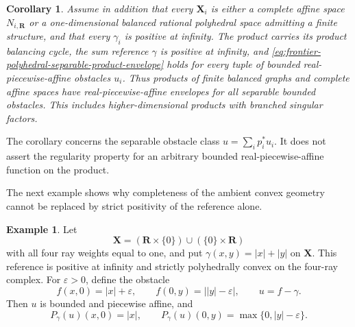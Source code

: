 \documentclass[11pt,a4paper]{article}
\newtheorem{corollary}[corollary]{Corollary}
\theoremstyle{definition}
\newtheorem{example}[example]{Example}
\theoremstyle{remark}
\begin{document}
\begin{corollary}
\label{cor:frontier-polyhedral-graph-affine-separable-regularity}
Assume in addition that every $\mathbf X_i$ is either a complete affine
space $N_{i,\mathbf R}$ or a one-dimensional balanced rational polyhedral
space admitting a finite structure, and that every $\gamma_i$ is positive
at infinity.  The product carries its product balancing cycle, the sum
reference $\gamma$ is positive at infinity, and
\eqref{eq:frontier-polyhedral-separable-product-envelope} holds for every
tuple of bounded real-piecewise-affine obstacles $u_i$.
Thus products of finite balanced graphs and complete affine spaces have
real-piecewise-affine envelopes for all separable bounded obstacles.  This
includes higher-dimensional products with branched singular factors.
\end{corollary}

The corollary concerns the separable obstacle class
$u=\sum_i p_i^*u_i$.  It does not assert the regularity property for an
arbitrary bounded real-piecewise-affine function on the product.








The next example shows why completeness of the ambient convex geometry
cannot be replaced by strict positivity of the reference alone.

\begin{example}\label{ex:frontier-polyhedral-cross-orthogonality}
Let
\[
 \mathbf X=(\mathbf R\times\{0\})\cup(\{0\}\times\mathbf R)
\]
with all four ray weights equal to one, and put
\(\gamma(x,y)=|x|+|y|\) on \(\mathbf X\).  This reference is positive at
infinity and strictly polyhedrally convex on the four-ray complex.  For
\(\varepsilon>0\), define the obstacle
\[
 f(x,0)=|x|+\varepsilon,
 \qquad
 f(0,y)=\bigl||y|-\varepsilon\bigr|,
 \qquad u=f-\gamma.
\]
Then \(u\) is bounded and piecewise affine, and
\[
 P_\gamma(u)(x,0)=|x|,
 \qquad
 P_\gamma(u)(0,y)=\max\{0,|y|-\varepsilon\}.
\]
\end{example}
\end{document}
